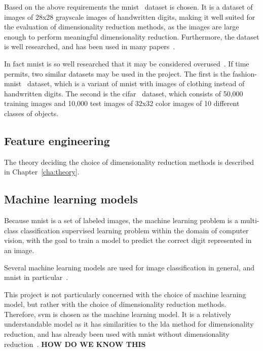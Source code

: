 Based on the above requirements the \gls{mnist}~\cite{lecun-mnist-database} dataset is chosen. It is a dataset of images of 28x28 grayscale images of handwritten digits, making it well suited for the evaluation of dimensionality reduction methods, as the images are large enough to perform meaningful dimensionality reduction. Furthermore, the dataset is well researched, and has been used in many papers~\cite{lecun-mnist-database}.

In fact \gls{mnist} is so well researched that it may be considered overused~\cite{fashion-mnist}. If time permits, two similar datasets may be used in the project. The first is the \gls{fashion-mnist}~\cite{fashion-mnist} dataset, which is a variant of \gls{mnist} with images of clothing instead of handwritten digits. The second is the \gls{cifar}~\cite{krizhevsky-cifar} dataset, which consists of 50,000 training images and 10,000 test images of 32x32 color images of 10 different classes of objects.


\subsection{Feature engineering}\label{subsec:feature-engineering}
The theory deciding the choice of dimensionality reduction methods is described in Chapter~\ref{cha:theory}.


\subsection{Machine learning models}\label{subsec:machine-learning-models}
Because \gls{mnist} is a set of labeled images, the machine learning problem is a multi-class classification supervised learning problem within the domain of computer vision, with the goal to train a model to predict the correct digit represented in an image.

Several machine learning models are used for image classification in general, and \gls{mnist} in particular~\cite{lecun-mnist-database,IBM-computer-vision,convolutional-neural-networks-convnets,multi-column-neural-network-ciregan}.

This project is not particularly concerned with the choice of machine learning model, but rather with the choice of dimensionality reduction methods. Therefore, \gls{svm} is chosen as the machine learning model. It is a relatively understandable model as it has similarities to the \gls{lda} method for dimensionality reduction, and has already been used with \gls{mnist} without dimensionality reduction~\cite{lecun-mnist-database}. \textbf{HOW DO WE KNOW THIS}

